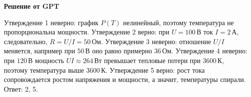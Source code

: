 \documentclass[12pt,a4paper]{article}
\begin{document}
{\begin{center}
\end{center}
}{
\smallskip\noindent\textbf{Решение от GPT}\par
Утверждение 1 неверно: график $P(T)$ нелинейный, поэтому температура не пропорциональна мощности. Утверждение 2 верно: при $U=100\,\text{В}$ ток $I=2\,\text{А}$, следовательно, $R=U/I=50\,\text{Ом}$. Утверждение 3 неверно: отношение $U/I$ меняется, например при $50\,\text{В}$ оно равно примерно $36\,\text{Ом}$. Утверждение 4 неверно: при $120\,\text{В}$ мощность $UI\approx264\,\text{Вт}$ превышает тепловые потери при $3600\,\text{К}$, поэтому температура выше $3600\,\text{К}$. Утверждение 5 верно: рост тока сопровождается ростом напряжения и мощности, а значит, температуры спирали. Ответ: 2, 5.
}
\end{document}
